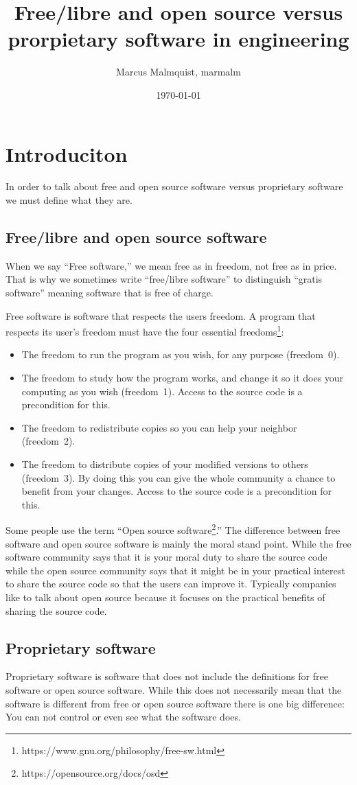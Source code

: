 \documentclass[12pt,a4paper]{article}
\title{Free/libre and open source versus prorpietary software in engineering}
\author{Marcus Malmquist, marmalm}
\date{\today}
\begin{document}
\maketitle

\section{Introduciton}
In order to talk about free and open source software versus proprietary software we must define what they are.
\subsection{Free/libre and open source software}\label{sec:free}
When we say ``Free software,'' we mean free as in freedom, not free as in price. That is why we sometimes write ``free/libre software'' to distinguish ``gratis software'' meaning software that is free of charge.

Free software is software that respects the users freedom. A program that respects its user's freedom must have the four essential freedoms\footnote{https://www.gnu.org/philosophy/free-sw.html}:
\begin{itemize}
\item The freedom to run the program as you wish, for any purpose (freedom~0).
\item The freedom to study how the program works, and change it so it does your computing as you wish (freedom~1). Access to the source code is a precondition for this.
\item The freedom to redistribute copies so you can help your neighbor (freedom~2).
\item The freedom to distribute copies of your modified versions to others (freedom~3). By doing this you can give the whole community a chance to benefit from your changes. Access to the source code is a precondition for this.
\end{itemize}
Some people use the term ``Open source software\footnote{https://opensource.org/docs/osd}.'' The difference between free software and open source software is mainly the moral stand point. While the free software community says that it is your moral duty to share the source code while the open source community says that it might be in your practical interest to share the source code so that the users can improve it. Typically companies like to talk about open source because it focuses on the practical benefits of sharing the source code.
\subsection{Proprietary software}
\noindent Proprietary software is software that does not include the definitions for free software or open source software. While this does not necessarily mean that the software is different from free or open source software there is one big difference: You can not control or even see what the software does.
\end{document}
